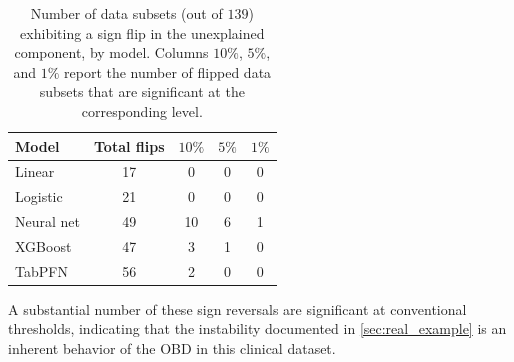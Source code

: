 \begin{table}[!ht]
    \caption{Number of data subsets (out of $139$) exhibiting a sign flip in the unexplained component, by model. Columns $10\%$, $5\%$, and $1\%$ report the number of flipped data subsets that are significant at the corresponding level.}
    \label{tab:flip_summary_unexplained}
    \centering
    \small
    \begin{tabular}{lcccc}
    \toprule
    Model & Total flips & $10\%$ & $5\%$ & $1\%$ \\
    \midrule
    Linear      & 17 &  0 &  0 &  0 \\
    Logistic    & 21 &  0 &  0 &  0 \\
    Neural net  & 49 & 10 &  6 &  1 \\
    XGBoost     & 47 & 3 &  1 &  0 \\
    TabPFN      & 56 & 2 &  0 &  0 \\
    \bottomrule
    \end{tabular}
\end{table}

A substantial number of these sign reversals are significant at conventional thresholds, indicating that the instability documented in \cref{sec:real_example} is an inherent behavior of the OBD in this clinical dataset.

    
    
